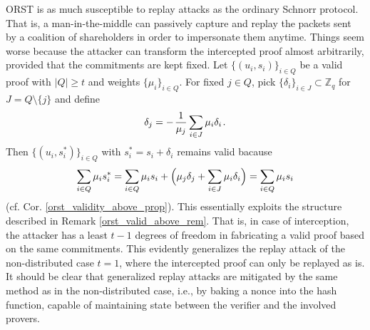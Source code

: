 \documentclass{iacrtrans}
\begin{document}
\textsf{ORST}
is as much susceptible to replay attacks
as the ordinary Schnorr protocol.
That is, a man-in-the-middle
can passively capture and replay
the packets sent by a coalition
of shareholders in order to impersonate them anytime.
Things seem worse
because the attacker can transform the
intercepted proof
almost arbitrarily,
provided that the commitments are kept fixed.
Let
$\{(u_i, s_i)\}_{i \in Q}$ be a
valid proof with $|Q| \ge t$ and weights $\{\mu_i\}_{i \in Q}$.
For fixed $j \in Q$,
pick $\{\delta_i\}_{i \in J} \subset \mathbb{Z}_q$
for $J = Q \setminus \{j\}$ and define
\vspace{5pt}
\begin{equation*}
\delta_j = -\hspace{1pt} \frac{1}{\mu_j}\sum_{i \in J} \mu_i \delta_i\hspace{1pt}.
\vspace{5pt}
\end{equation*}
Then $\{(u_i, s_i^*)\}_{i \in Q}$ with
$s_i^* = s_i + \delta_i$ remains valid bacause
\vspace{5pt}
\begin{equation*}
\sum_{i \in Q} \mu_i s_i^* =
\sum_{i \in Q} \mu_i s_i + \Big(\mu_j \delta_j + \sum_{i \in J} \mu_i \delta_i\Big) = 
\sum_{i \in Q} \mu_i s_i
\vspace{5pt}
\end{equation*}
\noindent
(cf. Cor. \ref{orst_validity_above_prop}).
This essentially exploits the structure described in
Remark \ref{orst_valid_above_rem}.
That is, in case of interception,
the attacker has a least $t-1$ degrees of freedom
in fabricating a valid proof based on the same commitments.
This evidently generalizes the replay attack of the non-distributed
case $t=1$, where the intercepted proof can only be replayed as is.
It should be clear that
generalized replay attacks are
mitigated by the same method as in the non-distributed case,
i.e., by baking a nonce into the hash function,
capable of maintaining state between
the verifier and the involved provers.
\end{document}
